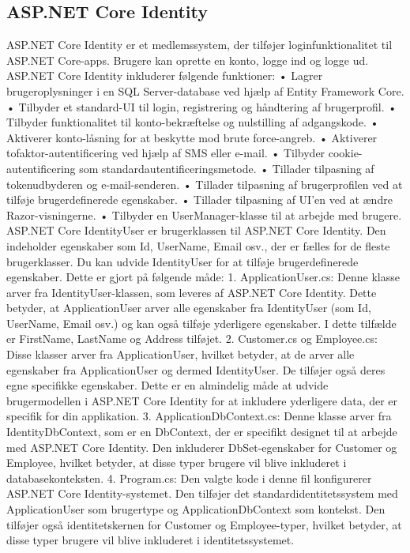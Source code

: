\subsection{ASP.NET Core Identity}
ASP.NET Core Identity er et medlemssystem, der tilføjer loginfunktionalitet til ASP.NET Core-apps. Brugere kan oprette en konto, logge ind og logge ud. ASP.NET Core Identity inkluderer følgende funktioner:
•	Lagrer brugeroplysninger i en SQL Server-database ved hjælp af Entity Framework Core.
•	Tilbyder et standard-UI til login, registrering og håndtering af brugerprofil.
•	Tilbyder funktionalitet til konto-bekræftelse og nulstilling af adgangskode.
•	Aktiverer konto-låsning for at beskytte mod brute force-angreb.
•	Aktiverer tofaktor-autentificering ved hjælp af SMS eller e-mail.
•	Tilbyder cookie-autentificering som standardautentificeringsmetode.
•	Tillader tilpasning af tokenudbyderen og e-mail-senderen.
•	Tillader tilpasning af brugerprofilen ved at tilføje brugerdefinerede egenskaber.
•	Tillader tilpasning af UI'en ved at ændre Razor-visningerne.
•	Tilbyder en UserManager-klasse til at arbejde med brugere.
ASP.NET Core IdentityUser er brugerklassen til ASP.NET Core Identity. Den indeholder egenskaber som Id, UserName, Email osv., der er fælles for de fleste brugerklasser. Du kan udvide IdentityUser for at tilføje brugerdefinerede egenskaber.
Dette er gjort på følgende måde:
1.	ApplicationUser.cs: Denne klasse arver fra IdentityUser-klassen, som leveres af ASP.NET Core Identity. Dette betyder, at ApplicationUser arver alle egenskaber fra IdentityUser (som Id, UserName, Email osv.) og kan også tilføje yderligere egenskaber. I dette tilfælde er FirstName, LastName og Address tilføjet.
2.	Customer.cs og Employee.cs: Disse klasser arver fra ApplicationUser, hvilket betyder, at de arver alle egenskaber fra ApplicationUser og dermed IdentityUser. De tilføjer også deres egne specifikke egenskaber. Dette er en almindelig måde at udvide brugermodellen i ASP.NET Core Identity for at inkludere yderligere data, der er specifik for din applikation.
3.	ApplicationDbContext.cs: Denne klasse arver fra IdentityDbContext, som er en DbContext, der er specifikt designet til at arbejde med ASP.NET Core Identity. Den inkluderer DbSet-egenskaber for Customer og Employee, hvilket betyder, at disse typer brugere vil blive inkluderet i databasekonteksten.
4.	Program.cs: Den valgte kode i denne fil konfigurerer ASP.NET Core Identity-systemet. Den tilføjer det standardidentitetssystem med ApplicationUser som brugertype og ApplicationDbContext som kontekst. Den tilføjer også identitetskernen for Customer og Employee-typer, hvilket betyder, at disse typer brugere vil blive inkluderet i identitetssystemet.

